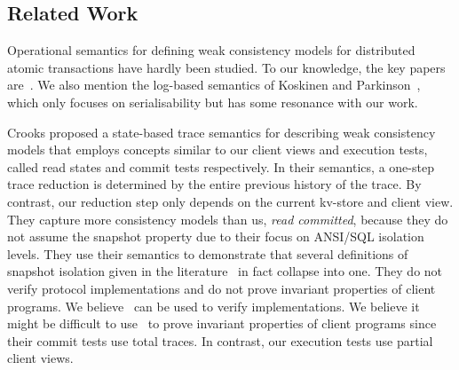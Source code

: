 \subsection{Related Work} 
\label{sec:newrelated}

Operational semantics for defining weak consistency models for
distributed atomic transactions have hardly been
studied. To our knowledge, the key papers
are~\cite{seebelieve,sureshConcur,alonetogether}. 
We also mention the log-based semantics of Koskinen and Parkinson~\citet{push-pull},
which only focuses on serialisability but has some resonance with our work. 

Crooks \etal\citet{seebelieve} proposed a state-based trace
semantics for describing weak consistency models that employs concepts
similar to our client views and execution tests, called read states and
commit tests respectively.  In their semantics, a one-step trace
reduction is determined by the entire previous history of the trace.
By contrast, our reduction step only depends on the current kv-store
and client view.  They capture more consistency models than us, \eg\emph{
  read committed}, because they do not assume the snapshot property
due to their focus on ANSI/SQL isolation levels. They use their semantics to 
demonstrate that 
several definitions of snapshot isolation given in the
literature~\cite{si,lazy-si,geo-si} in fact collapse into one.  They do not verify
protocol implementations and do not prove invariant properties of
client programs.  We believe~\cite{seebelieve} can be used to verify
implementations. We believe it might be  difficult to use~\cite{seebelieve}
to prove invariant properties of client programs since their commit tests 
use  total traces. In contrast,  our execution tests
use partial client views. 




